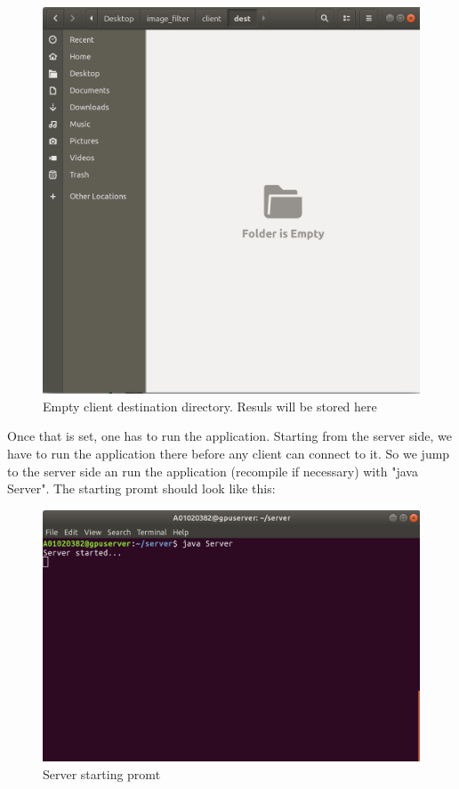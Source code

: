 \documentclass[a4paper,12pt]{article}
\begin{document}
	\begin{figure}[h]
		\centering
		\includegraphics[width=\textwidth]{emptydirclient.png}
		\caption{Empty client destination directory. Resuls will be stored here}
	\end{figure}	
	
	\vfill
	
	
	Once that is set, one has to run the application. Starting from the server side, we have to run the application there before any client can connect to it. So we jump to the server side an run the application (recompile if necessary) with "java Server". The starting promt should look like this:\\
	
	
	\begin{figure}[H]
		\centering
		\includegraphics[width=\textwidth]{serverinit.png}
		\caption{Server starting promt}
	\end{figure}	
	
\end{document}
